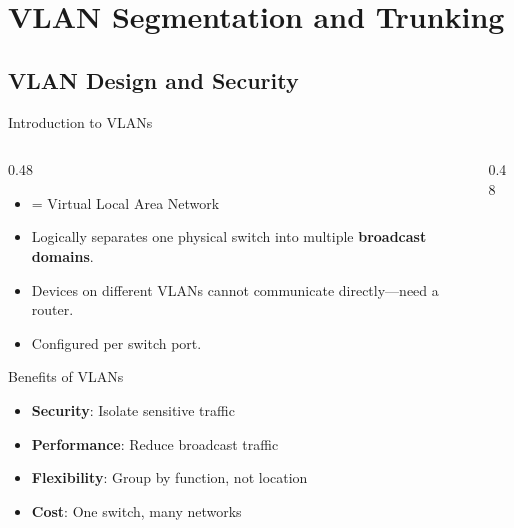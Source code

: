 \documentclass[aspectratio=169]{beamer}  %
\begin{document}
\section{VLAN Segmentation and Trunking}
\subsection{VLAN Design and Security}


\begin{frame}{Introduction to VLANs}
    \begin{columns}[T]
        \begin{column}{0.48\textwidth}
            \begin{itemize}
                \item {} = Virtual Local Area Network
                \item Logically separates one physical switch into multiple \textbf{broadcast domains}.
                \item Devices on different VLANs cannot communicate directly---need a router.
                \item Configured per switch port.
            \end{itemize}
            
            \vspace{0.2em}
            \begin{block}{Benefits of VLANs}
                \small
                \begin{itemize}\setlength{\itemsep}{1pt}
                    \item \textbf{Security}: Isolate sensitive traffic
                    \item \textbf{Performance}: Reduce broadcast traffic
                    \item \textbf{Flexibility}: Group by function, not location
                    \item \textbf{Cost}: One switch, many networks
                \end{itemize}
            \end{block}
        \end{column}
        \begin{column}{0.48\textwidth}
            \begin{center}
\end{center}
\end{column}
\end{columns}
\end{frame}
\end{document}
